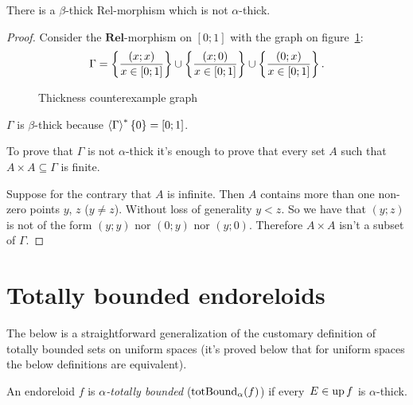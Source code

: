 \begin{example}
There is a $\beta$-thick Rel-morphism which is not $\alpha$-thick.\end{example}
\begin{proof}
Consider the $\mathbf{Rel}$-morphism on $[0;1]$ with the graph on
figure~\ref{fig:thick-counterexample}:
\[
\Gamma=\left\{ \frac{(x;x)}{x\in[0;1]}\right\}\cup\left\{ \frac{(x;0)}{x\in[0;1]}\right\}\cup\left\{ \frac{(0;x)}{x\in[0;1]}\right\}.
\]
\begin{figure}[ht]

\caption{\label{fig:thick-counterexample}Thickness counterexample graph}
\end{figure}


$\Gamma$ is $\beta$-thick because $\left\langle \Gamma\right\rangle ^{\ast}\{0\}=[0;1]$.

To prove that $\Gamma$ is not $\alpha$-thick it's enough to prove
that every set $A$ such that $A\times A\subseteq\Gamma$ is finite.

Suppose for the contrary that $A$ is infinite. Then $A$ contains
more than one non-zero points $y$, $z$ ($y\ne z$). Without loss
of generality $y<z$. So we have that $(y;z)$ is not of the form
$(y;y)$ nor $(0;y)$ nor $(y;0)$. Therefore $A\times A$ isn't a
subset of $\Gamma$.
\end{proof}

\section{Totally bounded endoreloids}

The below is a straightforward generalization of the customary definition
of totally bounded sets on uniform spaces (it's proved below that
for uniform spaces the below definitions are equivalent).
\begin{defn}
An endoreloid $f$ is \emph{$\alpha$-totally bounded} ($\operatorname{totBound}_{\alpha}(f)$)
if every~$E\in\operatorname{up} f$ is $\alpha$-thick.
\end{defn}


